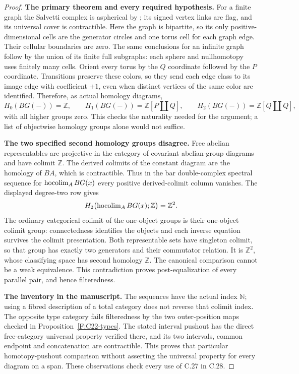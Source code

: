 \begin{proof}
\textbf{The primary theorem and every required hypothesis.}
For a finite graph the Salvetti complex is aspherical by
\cite[Theorem~2.6 and Section~2.7]{charney2007}; its signed vertex
links are flag, and its universal cover is contractible. Here the
graph is bipartite, so its only positive-dimensional cells are
the generator circles and one torus cell for each graph edge.
Their cellular boundaries are zero. The same conclusions for an
infinite graph follow by the union of its finite full subgraphs:
each sphere and nullhomotopy uses finitely many cells. Orient every
torus by the $Q$ coordinate followed by the $P$ coordinate.
Transitions preserve these colors, so they send each edge class
to its image edge with coefficient $+1$, even when distinct
vertices of the same color are identified. Therefore, as actual
homology diagrams,
\[
 H_0(BG(-))=\mathbb Z,\qquad
 H_1(BG(-))=\mathbb Z[P\amalg Q],\qquad
 H_2(BG(-))=\mathbb Z[Q\amalg Q],
\]
with all higher groups zero. This checks the naturality needed
for the argument; a list of objectwise homology groups alone
would not suffice.

\textbf{The two specified second homology groups disagree.}
Free abelian representables are projective in the category of
covariant abelian-group diagrams and have colimit $\mathbb Z$.
The derived colimits of the constant diagram are the homology of
$BA$, which is contractible. Thus in the bar double-complex
spectral sequence for $\operatorname{hocolim}_A BG(x)$ every positive
derived-colimit column vanishes. The displayed degree-two row
gives
\[
 H_2\bigl(\operatorname{hocolim}_A BG(x);\mathbb Z\bigr)=\mathbb Z^2.
\]
The ordinary categorical colimit of the one-object groups is
their one-object colimit group: connectedness identifies the
objects and each inverse equation survives the colimit
presentation. Both representable sets have singleton colimit,
so that group has exactly two generators and their commutator
relation. It is $\mathbb Z^2$, whose classifying space has second
homology $\mathbb Z$. The canonical comparison cannot be a weak
equivalence. This contradiction proves post-equalization of every
parallel pair, and hence filteredness.

\textbf{The inventory in the manuscript.}
The sequences have the actual index $\mathbb N$; using a fibred
description of a total category does not reverse that colimit
index. The opposite type category fails filteredness by the two
outer-position maps checked in Proposition~\ref{F:C22-types}.
The stated interval pushout has the direct free-category
universal property verified there, and its two intervals, common
endpoint and concatenation are contractible. This proves that
particular homotopy-pushout comparison without asserting the
universal property for every diagram on a span. These observations
check every use of C.27 in C.28.
\end{proof}
